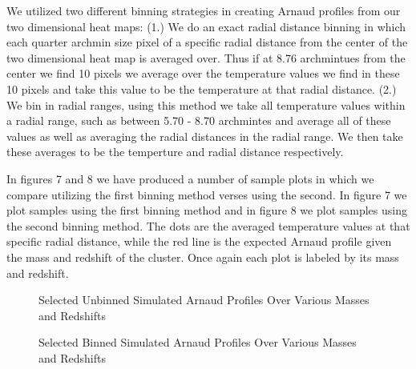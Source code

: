 \documentclass[12pt]{article} %
\begin{document}
We utilized two different binning strategies in creating Arnaud profiles from our two dimensional heat maps: (1.) We do an exact radial distance binning in which each quarter archmin size pixel of a specific radial distance from the center of the two dimensional heat map is averaged over. Thus if at 8.76 archmintues from the center we find 10 pixels we average over the temperature values we find in these 10 pixels and take this value to be the temperature at that radial distance. (2.) We bin in radial ranges, using this method we take all temperature values within a radial range, such as between 5.70 - 8.70 archmintes and average all of these values as well as averaging the radial distances in the radial range. We then take these averages to be the temperture and radial distance respectively. 

In figures 7 and 8  we have produced a number of sample plots in which we compare utilizing the first binning method verses using the second. In figure 7 we plot samples using the first binning method and in figure 8 we plot samples using the second binning method. The dots are the averaged temperature values at that specific radial distance, while the red line is the expected Arnaud profile given the mass and redshift of the cluster.  Once again each plot is labeled by its mass and redshift. 

\begin{figure}[!ht]
    \hfill
    \hfill
    \caption{Selected Unbinned Simulated Arnaud Profiles Over Various Masses and Redshifts}
    \label{fig:dummy}
  \end{figure}

\begin{figure}[!ht]
    \hfill
    \hfill
    \caption{Selected Binned Simulated Arnaud Profiles Over Various Masses and Redshifts}
    \label{fig:dummy}
  \end{figure}
\end{document}
